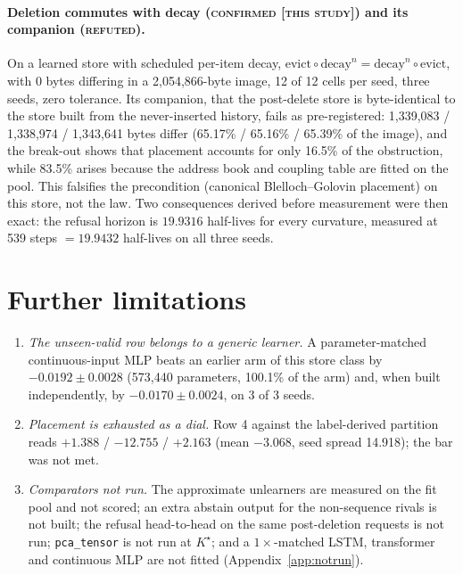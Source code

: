 \documentclass{article} %
\newcommand{\Kstar}{\ensuremath{K^{\star}}}
\begin{document}
\paragraph{Deletion commutes with decay (\textsc{confirmed [this study]}) and its companion
(\textsc{refuted}).} On a learned store with scheduled per-item decay,
$\text{evict}\circ\text{decay}^n=\text{decay}^n\circ\text{evict}$, with 0 bytes differing in a
2,054,866-byte image, 12 of 12 cells per seed, three seeds, zero tolerance.
Its companion, that the post-delete store is byte-identical to the store built from the
never-inserted history, fails as pre-registered: 1,339,083 / 1,338,974 / 1,343,641 bytes differ
(65.17\% / 65.16\% / 65.39\% of the image), and the break-out shows that placement accounts for
only 16.5\% of the obstruction, while 83.5\% arises because the address book and coupling table
are fitted on the pool. %
This falsifies the precondition (canonical Blelloch--Golovin placement) on this store, not the
law. Two consequences derived before measurement were then exact: the refusal horizon is $19.9316$
half-lives for every curvature, measured at 539 steps $=19.9432$ half-lives on all three seeds.


\section{Further limitations}
\label{app:morelimits}
\begin{enumerate}[leftmargin=*,itemsep=1pt]
\item \emph{The unseen-valid row belongs to a generic learner.} A parameter-matched
  continuous-input MLP beats an earlier arm of this store class by $-0.0192\pm0.0028$ (573,440
  parameters, 100.1\% of the arm) and, when built independently, by $-0.0170\pm0.0024$, on 3 of 3
  seeds. %
\item \emph{Placement is exhausted as a dial.} Row 4 against the label-derived partition reads
  $+1.388$ / $-12.755$ / $+2.163$ (mean $-3.068$, seed spread 14.918); the bar was not met.
\item \emph{Comparators not run.} The approximate unlearners are measured on the fit pool and
  not scored; an extra abstain output for the non-sequence rivals is not built; the refusal
  head-to-head on the same post-deletion requests is not run; \texttt{pca\_tensor} is not run at
  $\Kstar$; and a $1\times$-matched LSTM, transformer and continuous MLP are not fitted
  (Appendix~\ref{app:notrun}).
\end{enumerate}
\end{document}
